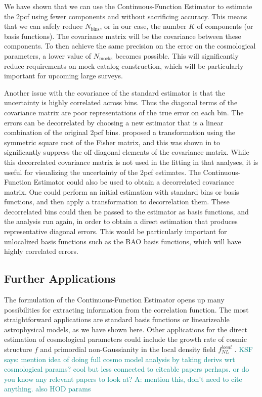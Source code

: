 \documentclass[modern]{aastex62}
\newcommand{\cf}{2pcf\xspace} %
\newcommand{\Est}{The Continuous-Function Estimator\xspace}
\newcommand{\est}{the Continuous-Function Estimator\xspace}
\newcommand{\NN}[1]{N_\mathrm{#1}}
\newcommand{\KSF}[1]{\textcolor{teal}{KSF says: #1}}
\begin{document}
We have shown that we can use \est to estimate the \cf using fewer components and without sacrificing accuracy.
This means that we can safely reduce $\NN{bins}$, or in our case, the number $K$ of components (or basis functions).
The covariance matrix will be the covariance between these components.
To then achieve the same precision on the error on the cosmological parameters, a lower value of $\NN{mocks}$ becomes possible.
This will significantly reduce requirements on mock catalog construction, which will be particularly important for upcoming large surveys. 

Another issue with the covariance of the standard estimator is that the uncertainty is highly correlated across bins.
Thus the diagonal terms of the covariance matrix are poor representations of the true error on each bin.
The errors can be decorrelated by choosing a new estimator that is a linear combination of the original \cf bins. 
\cite{Hamilton2000} proposed a transformation using the symmetric square root of the Fisher matrix, and this was shown in \cite{Anderson2014} to significantly suppress the off-diagonal elements of the covariance matrix.
While this decorrelated covariance matrix is not used in the fitting in that analyses, it is useful for visualizing the uncertainty of the \cf estimates.
\Est could also be used to obtain a decorrelated covariance matrix.
One could perform an initial estimation with standard bins or basis functions, and then apply a transformation to decorrelation them.
These decorrelated bins could then be passed to the estimator as basis functions, and the analysis run again, in order to obtain a direct estimation that produces representative diagonal errors.
This would be particularly important for unlocalized basis functions such as the BAO basis functions, which will have highly correlated errors.

\subsection{Further Applications}
\label{sec:applications}

The formulation of \est opens up many possibilities for extracting information from the correlation function.
The most straightforward applications are standard basis functions or linearizeable astrophysical models, as we have shown here.
Other applications for the direct estimation of cosmological parameters could include the growth rate of cosmic structure $f$ \citep{Satpathy2016, Reid2018} and primordial non-Gaussianity in the local density field $f^{local}_{NL}$ \citep{Karagiannis2014}.
\KSF{mention idea of doing full cosmo model analysis by taking derivs wrt cosmological params? cool but less connected to citeable papers perhaps. or do you know any relevant papers to look at? A: mention this, don't need to cite anything. also HOD params}
\end{document}
